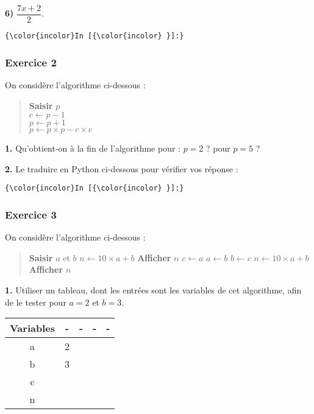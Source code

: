 \documentclass[11pt]{article}
\begin{document}
    \textbf{6)} \(\dfrac{7x+2}{2}\).

    \begin{Verbatim}[commandchars=\\\{\}]
{\color{incolor}In [{\color{incolor} }]:} 
\end{Verbatim}

    \hypertarget{exercice-2}{%
\subsubsection{Exercice 2}\label{exercice-2}}

On considère l'algorithme ci-dessous :

\begin{quote}
\textbf{Saisir} \(p\)\\
\(c\leftarrow p-1\)\\
\(p\leftarrow p+1\)\\
\(p\leftarrow p\times p-c\times c\)
\end{quote}

\textbf{1.} Qu'obtient-on à la fin de l'algorithme pour : \(p=2\) ? pour
\(p=5\) ?

    

    \textbf{2.} Le traduire en Python ci-dessous pour vérifier vos réponse :

    \begin{Verbatim}[commandchars=\\\{\}]
{\color{incolor}In [{\color{incolor} }]:} 
\end{Verbatim}

    \hypertarget{exercice-3}{%
\subsubsection{Exercice 3}\label{exercice-3}}

On considère l'algorithme ci-dessous :

\begin{quote}
\textbf{Saisir} \(a\) et \(b\) \(n\leftarrow 10\times a+b\)
\textbf{Afficher} \(n\) \(c\leftarrow a\) \(a\leftarrow b\)
\(b\leftarrow c\) \(n\leftarrow 10\times a+b\) \textbf{Afficher} \(n\)
\end{quote}

    \textbf{1.} Utiliser un tableau, dont les entrées sont les variables de
cet algorithme, afin de le tester pour \(a=2\) et \(b=3\).

    \begin{longtable}[]{@{}ccccc@{}}
\toprule
Variables & - & - & - & -\tabularnewline
\midrule
\endhead
a & 2 & & &\tabularnewline
b & 3 & & &\tabularnewline
c & & & &\tabularnewline
n & & & &\tabularnewline
\bottomrule
\end{longtable}
\end{document}
